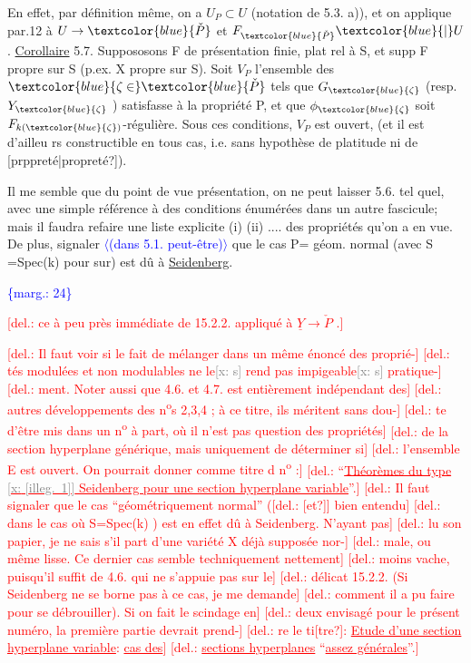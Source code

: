 \documentclass[11pt]{article}
\newcommand{\scanpage}[1]{\par\bigskip\noindent{\small\sffamily[scan #1]}\par}
\newcommand{\mspage}[1]{{\small\sffamily[p.\,#1]}}
\newcommand{\hand}[1]{\textcolor{blue}{#1}}
\let\over\relax
\newcommand{\over}[2]{\textcolor{gray}{#1}\textcolor{blue}{\ensuremath{^{\!\nearrow}}#2}}
\newcommand{\inserted}[2][]{\textcolor{blue}{$\langle$#2$\rangle$}}
\newcommand{\margin}[1]{\textcolor{blue}{\{\textsf{marg.:} #1\}}}
\newcommand{\deleted}[1]{\textcolor{red}{[\textsf{del.:} #1]}}
\newcommand{\xout}[1]{\textcolor{gray}{[\textsf{x:} #1]}}
\newcommand{\uline}[1]{\underline{#1}}
\newcommand{\unsure}[1]{[#1?]}
\newcommand{\illegible}[1]{[\textsf{illeg.\ #1}]}
\begin{document}
En effet, par définition même, on a $U_P \subset U$ (notation de 5.3. a)),
et on applique par.12 à $U \to \hand{\check{P}}$ et $F_{\hand{\check{P}}}\hand{|}U$.
\uline{Corollaire} 5.7. Suppososons F de présentation finie, plat rel à S,
et supp F propre sur S (p.ex. X propre sur S). Soit $V_P$ l'ensemble des
$\hand{\zeta\in}\hand{\check{P}}$ tels que $G_{\hand{\zeta}}$ (resp. $Y_{\hand{\zeta}}$ ) satisfasse à la propriété P, et que $\phi_{\hand{\zeta}}$ soit
$F_{k(\hand{\zeta})}$-régulière. Sous ces conditions, $V_P$ est ouvert, (et il est d'ailleu
rs constructible en tous cas, i.e. sans hypothèse de platitude ni de
\unsure{prppreté|propreté}).

Il me semble que du point de vue présentation, on ne peut laisser
5.6. tel quel, avec une simple référence à des conditions énumérées dans
un autre fascicule; mais il faudra refaire une liste explicite (i) (ii)
.... des propriétés qu'on a en vue. De plus, signaler \inserted{(dans 5.1. peut-être)} que le cas P= géom.
normal (avec S =Spec(k) pour sur) est dû à \uline{Seidenberg}.

\margin{24}

\clearpage
\scanpage{25/25}
\mspage{\hand{21 bis}}

\deleted{ce à peu près immédiate de 15.2.2. appliqué à $\underline{Y} \longrightarrow \check{P}$ .}

\deleted{Il faut voir si  le fait de mélanger dans un même énoncé des proprié-}%
\deleted{tés modulées et non modulables  ne le\xout{s} rend pas  impigeable\xout{s} pratique-}%
\deleted{ment. Noter aussi  que 4.6. et 4.7. est entièrement indépendant des}
\deleted{autres développements des n\textsuperscript{o}s 2,3,4 ; à ce titre, ils méritent sans dou-}%
\deleted{te d'être mis dans un n\textsuperscript{o} à part, où il n'est pas question des propriétés}
\deleted{de la section hyperplane générique, mais uniquement de déterminer si}
\deleted{l'ensemble E est ouvert. On pourrait donner comme titre d\over{a}{e} n\textsuperscript{o} :}
\deleted{``\uline{Théorèmes du type \xout{\illegible{1}} Seidenberg pour une section hyperplane variable}''.}
\deleted{Il faut signaler que le cas  ``géométriquement normal'' (\deleted{\unsure{et}} bien entendu}
\deleted{dans le cas où S=Spec(k) )  est en effet dû à Seidenberg. N'ayant pas}
\deleted{lu son papier, je ne sais s'il part d'une variété X déjà supposée nor-}%
\deleted{male, ou même lisse.  Ce dernier cas semble techniquement nettement}
\deleted{moins vache, puisqu'il suffit de 4.6. qui ne s'appuie pas sur le}
\deleted{délicat 15.2.2.  (Si Seidenberg ne se borne pas à ce cas, je me demande}
\deleted{comment il a pu faire pour se débrouiller).  Si on fait le scindage en}
\deleted{deux envisagé pour le présent numéro, la première partie  devrait prend-}%
\deleted{re le ti\unsure{tre}:  \uline{Etude d'une section hyperplane variable}: \uline{cas des}}
\deleted{\uline{sections hyperplanes} ``\uline{assez générales}''.}
\end{document}
